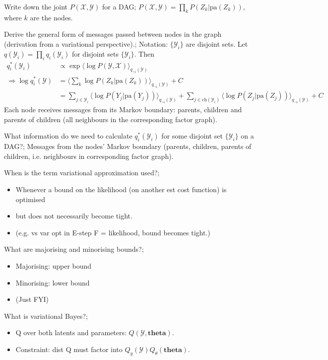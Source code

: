 \documentclass{article}
\begin{document}
Write down the joint $P(\mathcal{X, Y})$ for a DAG; $P(\mathcal{X, Y}) = \prod_k P(Z_k|\text{pa}(Z_k))$, where $k$ are the nodes.

Derive the general form of messages passed between nodes in the graph (derivation from a variational perspective).; Notation: $\{\mathcal{Y}_i\}$ are disjoint sets.
Let $q(\mathcal{Y}_i) = \prod_iq_i(\mathcal{Y}_i)$ for disjoint sets $\{\mathcal{Y}_i\}$. Then
\begin{align*}
    q_i^*(\mathcal{Y}_i) &\propto \exp \langle \log P(\mathcal{Y, X}) \rangle_{q_{\neg i}(\mathcal{Y})} \\
    \Rightarrow \log q^*_i(\mathcal{Y}) &= \langle \sum_k \log P(Z_k |\text{pa}(Z_k)) \rangle_{q_{\neg i}(\mathcal{Y})} + C\\
    &= \sum_{j\in \mathcal{Y}_i} \langle\log P(Y_j |\text{pa}(Y_j)) \rangle_{q_{\neg i}(\mathcal{Y})} +  \sum_{j\in \text{ch}(\mathcal{Y}_i)} \langle \log P(Z_j |\text{pa}(Z_j)) \rangle_{q_{\neg i}(\mathcal{Y})} + C 
\end{align*} Each node receives messages from its Markov boundary: parents, children and parents of children (all neighbours in the corresponding factor graph).

What information do we need to calculate $q_i^*(\mathcal{Y}_i)$ for some disjoint set $\{\mathcal{Y}_i\}$ on a DAG?; Messages from the nodes' Markov boundary (parents, children, parents of children, i.e. neighbours in corresponding factor graph).

When is the term variational approximation used?; \begin{itemize}
    \item Whenever a bound on the likelihood (on another est cost function) is optimised
    \item but does not necessarily become tight. 
    \item (e.g. vs var opt in E-step F = likelihood, bound becomes tight.)
\end{itemize}

What are majorising and minorising bounds?; \begin{itemize}
    \item Majorising: upper bound
    \item Minorising: lower bound
    \item (Just FYI)
\end{itemize}

What is variational Bayes?; \begin{itemize}
    \item Q over both latents and parameters: $Q(\mathcal{Y}, \bm{theta})$.
    \item Constraint: dist Q must factor into $Q_y(\mathcal{Y})Q_\theta(\bm{theta})$.
\end{itemize}
\end{document}
